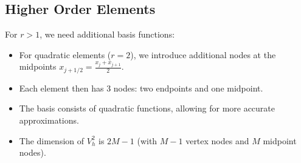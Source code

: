 \subsection{Higher Order Elements}
For $r > 1$, we need additional basis functions:

\begin{itemize}
  \item For quadratic elements ($r=2$), we introduce additional nodes at the midpoints $x_{j+1/2} = \frac{x_j + x_{j+1}}{2}$.
  \item Each element then has 3 nodes: two endpoints and one midpoint.
  \item The basis consists of quadratic functions, allowing for more accurate approximations.
  \item The dimension of $V_h^2$ is $2M-1$ (with $M-1$ vertex nodes and $M$ midpoint nodes).
\end{itemize}

